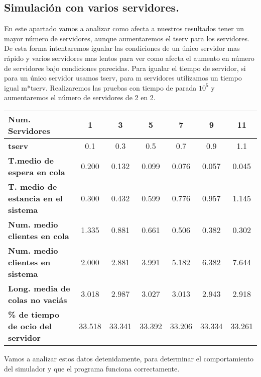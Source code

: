 \documentclass[]{article}
\begin{document}
\subsection{Simulación con varios servidores.}
En este apartado vamos a analizar como afecta a nuestros resultados tener un mayor número de servidores, aunque aumentaremos el tserv para los servidores. De esta forma intentaremos igualar las condiciones de un único servidor mas rápido y varios servidores mas lentos para ver como afecta el aumento en número de servidores bajo condiciones parecidas. Para igualar el tiempo de servidor, si para un único servidor usamos tserv, para m servidores utilizamos un tiempo igual m*tserv.
Realizaremos las pruebas con tiempo de parada $10^5$ y aumentaremos el número de servidores de 2 en 2.

\begin{table}[H]
	\begin{center}
		\begin{tabularx}{1\textwidth}{|X|c|c|c|c|c|c|}
			\hline
			\textbf{Num. Servidores} & 1 & 3 & 5 & 7 & 9 & 11\\
			\hline \hline
			\textbf{tserv} & 0.1 & 0.3 & 0.5 & 0.7 & 0.9 & 1.1\\ \hline
			\textbf{T.medio de espera en cola}& 0.200&0.132 &0.099 &0.076 &0.057 &0.045\\ \hline
			\textbf{T. medio de estancia en el sistema}& 0.300 &0.432 &0.599 &0.776 &0.957 &1.145\\ \hline
			\textbf{Num. medio clientes en cola}& 1.335 &0.881 &0.661 &0.506 &0.382 &0.302\\  \hline
			\textbf{Num. medio clientes en sistema}& 2.000 &2.881 &3.991 &5.182 &6.382 &7.644\\ \hline
			\textbf{Long. media de colas no vaciás}&3.018& 2.987&3.027 &3.013 &2.943 &2.918\\ \hline
			\textbf{\% de tiempo de ocio del servidor}&33.518& 33.341&33.392 &33.206 &33.334 &33.261\\ \hline
		\end{tabularx}
		
	\end{center}
\end{table}
Vamos a analizar estos datos detenidamente, para determinar el comportamiento del simulador y que el programa funciona correctamente.
\end{document}
